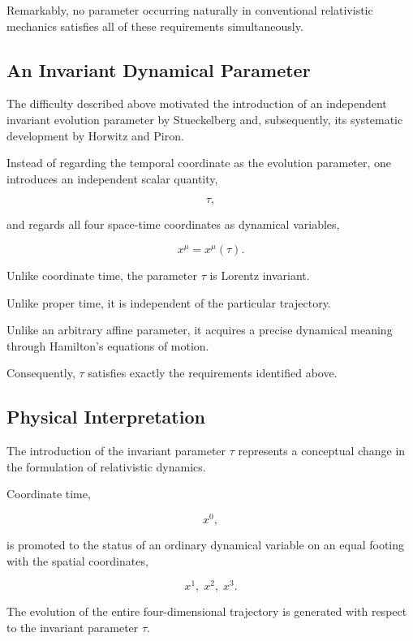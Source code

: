 Remarkably, no parameter occurring naturally in conventional
relativistic mechanics satisfies all of these requirements
simultaneously.

\subsection{An Invariant Dynamical Parameter}

The difficulty described above motivated the introduction of an
independent invariant evolution parameter by Stueckelberg and,
subsequently, its systematic development by Horwitz and Piron.

Instead of regarding the temporal coordinate as the evolution
parameter, one introduces an independent scalar quantity,

\[
\tau,
\]

and regards all four space-time coordinates as dynamical variables,

\[
x^\mu=x^\mu(\tau).
\]

Unlike coordinate time, the parameter \(\tau\) is Lorentz invariant.

Unlike proper time, it is independent of the particular trajectory.

Unlike an arbitrary affine parameter, it acquires a precise dynamical
meaning through Hamilton's equations of motion.

Consequently, \(\tau\) satisfies exactly the requirements identified
above.

\subsection{Physical Interpretation}

The introduction of the invariant parameter \(\tau\) represents a
conceptual change in the formulation of relativistic dynamics.

Coordinate time,

\[
x^0,
\]

is promoted to the status of an ordinary dynamical variable on an equal
footing with the spatial coordinates,

\[
x^1,\;
x^2,\;
x^3.
\]

The evolution of the entire four-dimensional trajectory is generated
with respect to the invariant parameter \(\tau\).

